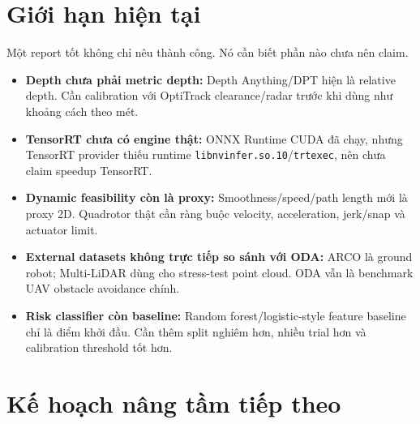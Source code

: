\documentclass[10pt,a4paper]{article}
\newcommand{\code}[1]{\texttt{#1}}
\begin{document}
\section{Giới hạn hiện tại}

Một report tốt không chỉ nêu thành công. Nó cần biết phần nào chưa nên claim.

\begin{itemize}
  \item \textbf{Depth chưa phải metric depth:} Depth Anything/DPT hiện là relative depth. Cần calibration với OptiTrack clearance/radar trước khi dùng như khoảng cách theo mét.
  \item \textbf{TensorRT chưa có engine thật:} ONNX Runtime CUDA đã chạy, nhưng TensorRT provider thiếu runtime \code{libnvinfer.so.10}/\code{trtexec}, nên chưa claim speedup TensorRT.
  \item \textbf{Dynamic feasibility còn là proxy:} Smoothness/speed/path length mới là proxy 2D. Quadrotor thật cần ràng buộc velocity, acceleration, jerk/snap và actuator limit.
  \item \textbf{External datasets không trực tiếp so sánh với ODA:} ARCO là ground robot; Multi-LiDAR dùng cho stress-test point cloud. ODA vẫn là benchmark UAV obstacle avoidance chính.
  \item \textbf{Risk classifier còn baseline:} Random forest/logistic-style feature baseline chỉ là điểm khởi đầu. Cần thêm split nghiêm hơn, nhiều trial hơn và calibration threshold tốt hơn.
\end{itemize}

\section{Kế hoạch nâng tầm tiếp theo}
\end{document}
